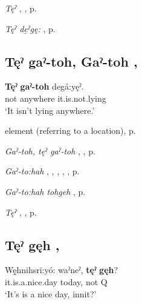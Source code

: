 \begin{CayugaRelated}
\item \textit{Tęˀ} , , p. \pageref{p:[tęˀ]}\\
\item \textit{Tęˀ de̱ˀgę:} , p. \pageref{p:[tęˀ deˀgę:]}
\end{CayugaRelated}

\subsection*{\textbf{Tęˀ gaˀ-toh, Gaˀ-toh} , } \label{p:[tęˀ gaˀ-toh]}

\ea
\label{ex:tpart27}
\gll \textbf{Tęˀ} \textbf{gaˀ-toh} degá:yęˀ.\\
not anywhere it.is.not.lying\\
\glt ‘It isn’t lying anywhere.’
\z

\begin{CayugaRelated}
\item {} element (referring to a location), p. \pageref{p:[gaˀ-]}\\
\item \textit{Gaˀ-toh, tęˀ gaˀ-toh} , , p. \pageref{p:[gaˀ-toh, tęˀ gaˀ-toh]}\\
\item \textit{Gaˀ-to:hah} , , , , , p. \pageref{p:[gaˀ-to:hah]}\\
\item \textit{Gaˀ-to:hah tohgeh} , p. \pageref{p:[gaˀ-to:hah tohgeh]}\\
\item \textit{Tęˀ} , , p. \pageref{p:[tęˀ]}
\end{CayugaRelated}


\subsection*{\textbf{Tęˀ gęh} , } \label{p:[tęˀ gęh]}

\ea
\label{ex:tpart28}
\gll Wę̱hnihsri:yó: waˀneˀ, \textbf{tęˀ} \textbf{gęh}?\\
it.is.a.nice.day today, not Q\\
\glt ‘It’s is a nice day, innit?’
\z

